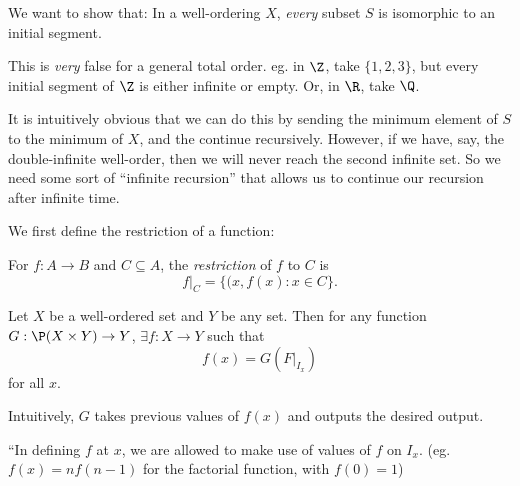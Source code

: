 \documentclass[a4paper]{article}
\begin{document}
We want to show that: In a well-ordering $X$, \emph{every} subset $S$ is isomorphic to an initial segment.

\note This is \emph{very} false for a general total order. eg. in $\Z$, take $\{1, 2, 3\}$, but every initial segment of $\Z$ is either infinite or empty. Or, in $\R$, take $\Q$.

It is intuitively obvious that we can do this by sending the minimum element of $S$ to the minimum of $X$, and the continue recursively. However, if we have, say, the double-infinite well-order, then we will never reach the second infinite set. So we need some sort of ``infinite recursion'' that allows us to continue our recursion after infinite time.

We first define the restriction of a function:
\begin{defi}
  For $f: A\to B$ and $C\subseteq A$, the \emph{restriction}  of $f$ to $C$ is 
  \[
    f|_C = \{(x, f(x): x\in C\}.
  \]
\end{defi}

\begin{thm}
  Let $X$ be a well-ordered set and $Y$ be any set. Then for any function $G: \P(X\times Y)\to Y$, $\exists f:X\to Y$ such that
  \[
    f(x) = G(F|_{I_x})
  \]
  for all $x$.

  Intuitively, $G$ takes previous values of $f(x)$ and outputs the desired output.

  ``In defining $f$ at $x$, we are allowed to make use of values of $f$ on $I_x$. (eg. $f(x) = nf(n - 1)$ for the factorial function, with $f(0) = 1$)
\end{thm}
\end{document}
